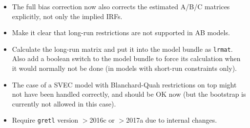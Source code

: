 \documentclass[a4paper,10pt]{article}
\newcommand{\dtk}[1]{\texttt{\detokenize{#1}}}
\begin{document}
\begin{itemize}

\item The full bias correction now also corrects the estimated A/B/C matrices
explicitly, not only the implied IRFs.

\item Make it clear that long-run restrictions are not supported in AB models.

\item Calculate the long-run matrix and put it into the model bundle as \texttt{lrmat}.
Also add a boolean switch \dtk{calc_lr} to the model bundle to force its 
calculation when it would normally not be done 
(in models with short-run constraints only).

\item The case of a SVEC model with Blanchard-Quah restrictions on top might 
not have been handled correctly, and should be OK now (but the bootstrap is 
currently not allowed in this case).

\item Require \texttt{gretl} version $>$2016c or $>$2017a due to internal changes.

\end{itemize}
\end{document}
